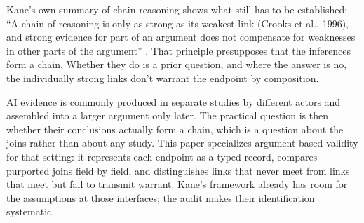\documentclass[12pt]{article}
\begin{document}
Kane's own summary of chain reasoning shows what still has to be established: \enquote{A chain of reasoning is only as strong as its weakest link (Crooks et al., 1996), and strong evidence for part of an argument does not compensate for weaknesses in other parts of the argument} \citep[64]{kane2013validating}. That principle presupposes that the inferences form a chain. Whether they do is a prior question, and where the answer is no, the individually strong links don't warrant the endpoint by composition.

AI evidence is commonly produced in separate studies by different actors and assembled into a larger argument only later. The practical question is then whether their conclusions actually form a chain, which is a question about the joins rather than about any study. This paper specializes argument-based validity for that setting: it represents each endpoint as a typed record, compares purported joins field by field, and distinguishes links that never meet from links that meet but fail to transmit warrant. Kane's framework already has room for the assumptions at those interfaces; the audit makes their identification systematic.
\end{document}
